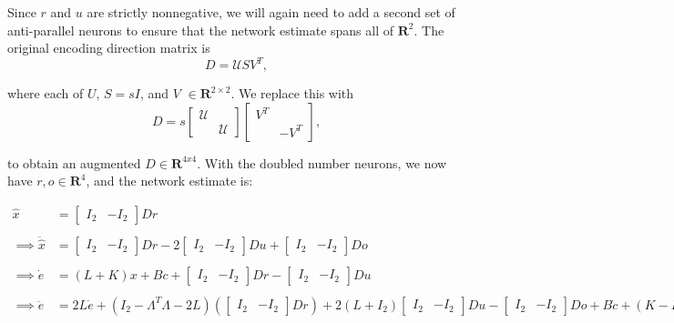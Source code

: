 \begin{itemize}
Since $r$ and $u$ are strictly nonnegative, we will again need to add a second set of anti-parallel neurons to ensure that the network estimate spans all of $\mathbf{R}^2$. The original encoding direction matrix is
$$
D = \mathcal{U} S V^T,
$$

where each of $U$, $S = sI$, and $V$ $\in \mathbf{R}^{2 \times 2}$.  We replace this with 
$$
D = s\begin{bmatrix}
\mathcal{U}  & 
\\
& \mathcal{U}
\end{bmatrix}
\begin{bmatrix}
V^T &  
\\
& -V^T
\end{bmatrix},
$$

to obtain an augmented $D \in \mathbf{R}^{4 x 4}$. With the doubled number neurons, we now have $r, o \in \mathbf{R}^{4}$, and the network estimate is:


\begin{align*}
\hat{x} 
&= 
\begin{bmatrix} I_2 &  -I_2\end{bmatrix} Dr
\\
\\
\implies
\ddot{\hat{x}} 
&=
\begin{bmatrix} I_2 &  -I_2\end{bmatrix} Dr
- 
2
\begin{bmatrix} I_2 &  -I_2\end{bmatrix} Du
+
\begin{bmatrix} I_2 &  -I_2\end{bmatrix} Do
\\
\\
\implies
\dot{e}
&=
(L + K)x + Bc + \begin{bmatrix}
I_2 & -I_2
\end{bmatrix}Dr
- 
\begin{bmatrix}
I_2 & -I_2
\end{bmatrix}
Du
\\
\\
\implies
\ddot{e}
&= 
2 L \dot{e} + (I_2-\Lambda^T \Lambda - 2L) \left(\begin{bmatrix} I_2 &  -I_2\end{bmatrix} Dr\right)
+
2 (L + I_2) \begin{bmatrix} I_2 &  -I_2\end{bmatrix} Du
-
\begin{bmatrix} I_2 &  -I_2\end{bmatrix} Do + B\dot{c} + (K-L)Bc.
\end{align*}



\end{itemize}
